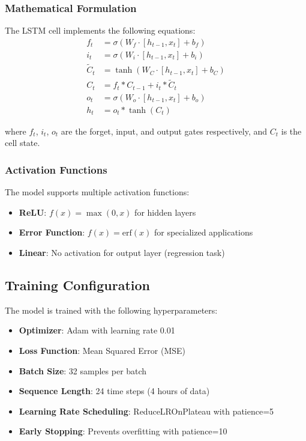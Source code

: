 \documentclass[12pt,a4paper]{article}
\begin{document}
\subsubsection{Mathematical Formulation}
The LSTM cell implements the following equations:
\begin{align}
f_t &= \sigma(W_f \cdot [h_{t-1}, x_t] + b_f) \\
i_t &= \sigma(W_i \cdot [h_{t-1}, x_t] + b_i) \\
\tilde{C}_t &= \tanh(W_C \cdot [h_{t-1}, x_t] + b_C) \\
C_t &= f_t * C_{t-1} + i_t * \tilde{C}_t \\
o_t &= \sigma(W_o \cdot [h_{t-1}, x_t] + b_o) \\
h_t &= o_t * \tanh(C_t)
\end{align}

where $f_t$, $i_t$, $o_t$ are the forget, input, and output gates respectively, and $C_t$ is the cell state.

\subsubsection{Activation Functions}
The model supports multiple activation functions:
\begin{itemize}
    \item \textbf{ReLU}: $f(x) = \max(0, x)$ for hidden layers
    \item \textbf{Error Function}: $f(x) = \text{erf}(x)$ for specialized applications
    \item \textbf{Linear}: No activation for output layer (regression task)
\end{itemize}

\subsection{Training Configuration}
The model is trained with the following hyperparameters:
\begin{itemize}
    \item \textbf{Optimizer}: Adam with learning rate 0.01
    \item \textbf{Loss Function}: Mean Squared Error (MSE)
    \item \textbf{Batch Size}: 32 samples per batch
    \item \textbf{Sequence Length}: 24 time steps (4 hours of data)
    \item \textbf{Learning Rate Scheduling}: ReduceLROnPlateau with patience=5
    \item \textbf{Early Stopping}: Prevents overfitting with patience=10
\end{itemize}
\end{document}
